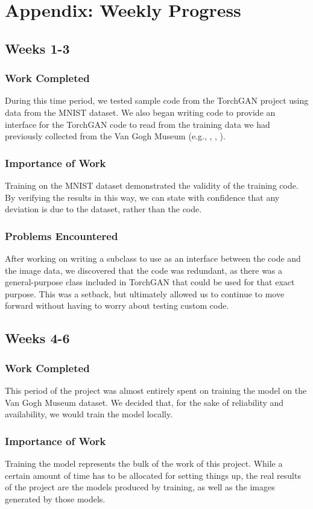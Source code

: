 \documentclass[11pt,letterpaper]{article}
\begin{document}
\appendix
	\section{Appendix: Weekly Progress}
		\subsection{Weeks 1-3}
		\label{subsec:weekly:1-3}
			\subsubsection{Work Completed}
				During this time period, we tested sample code from the TorchGAN\cite{pal2019torchgan} project using data from the MNIST\cite{lecun2010mnist} dataset.
				We also began writing code to provide an interface for the TorchGAN code to read from the training data we had previously collected from the Van Gogh Museum (e.g., \cite{001}, \cite{002}, \cite{003}).
			\subsubsection{Importance of Work}
				Training on the MNIST dataset demonstrated the validity of the training code.
				By verifying the results in this way, we can state with confidence that any deviation is due to the dataset, rather than the code.
			\subsubsection{Problems Encountered}
				After working on writing a subclass to use as an interface between the code and the image data, we discovered that the code was redundant, as there was a general-purpose class included in TorchGAN that could be used for that exact purpose.
				This was a setback, but ultimately allowed us to continue to move forward without having to worry about testing custom code.

		\subsection{Weeks 4-6}
			\subsubsection{Work Completed}
				This period of the project was almost entirely spent on training the model on the Van Gogh Museum dataset.
				We decided that, for the sake of reliability and availability, we would train the model locally.
			\subsubsection{Importance of Work}
				Training the model represents the bulk of the work of this project.
				While a certain amount of time has to be allocated for setting things up, the real results of the project are the models produced by training, as well as the images generated by those models.
\end{document}
